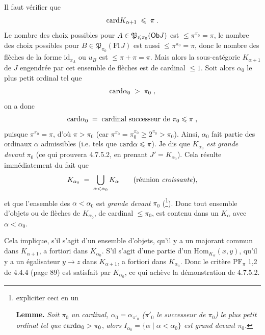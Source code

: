 Il faut vérifier que
\[
\mathrm{card} K_{\alpha+1} \;\leqslant\; \pi \;.
\]
Le nombre des choix possibles pour $A \in \mathfrak{P}_{\leqslant \pi_0}(\mathsf{Ob} J)$  est $\leqslant \pi^{\pi_0} = \pi$, le nombre des choix possibles pour $B \in \mathfrak{P}_{\pi_0}(\mathrm{Fl}\, J)$ est aussi $\leqslant \pi^{\pi_0} = \pi$, donc le nombre des flèches de la forme $\mathrm{id}_{x_A}$ ou $u_B$ est $\leqslant \pi + \pi = \pi$. Mais alors la sous-catégorie $K_{\alpha+1}$ de $J$ engendrée par cet ensemble de flèches est de cardinal $\leqslant 1$. Soit alors %
{}
$\alpha_0$ le plus petit ordinal tel que
\[
\mathrm{card} \alpha_0 \;>\; \pi_0 \;,
\]
on a donc
\[
\mathrm{card} \alpha_0 \;=\; \text{cardinal successeur de } \pi_0 \leqslant \pi \;,
\]
puisque $\pi^{\pi_0} = \pi$, d’où $\pi > \pi_0$ (car $\pi^{\pi_0} = \pi_0^{\pi_0} \geqslant 2^{\pi_0} > \pi_0$). Ainsi, $\alpha_0$ fait partie des ordinaux $\alpha$ admissibles (i.e. tels que $\mathrm{card} \alpha \leqslant \pi$). Je dis que $K_{\alpha_0}$ \textit{est grande devant} $\pi_0$ (ce qui prouvera 4.7.5.2, en prenant $J' = K_{\alpha_0}$). Cela résulte immédiatement du fait que
\[
K_{\alpha_0} \;=\; \bigcup_{\alpha < \alpha_0} K_{\alpha} \qquad (\text{réunion \textit{croissante}}),
\]
et que l’ensemble des $\alpha < \alpha_0$ est \textit{grande devant} $\pi_0$ (\footnote[71]{expliciter ceci en un

\textbf{Lemme.} \textit{Soit $\pi_0$ un cardinal, $\alpha_0 = \alpha_{\pi'_0}$ ($\pi'_0$ le successeur de $\pi_0$) le plus petit ordinal tel que} $\mathrm{card} \alpha_0 > \pi_0$, \textit{alors $I_{\alpha_0} = \{\alpha \mid \alpha < \alpha_0\}$ est grand devant $\pi_0$.}}). Donc tout ensemble d’objets ou de flèches de $K_{\alpha_0}$, de cardinal $\leqslant \pi_0$, est contenu dans un $K_{\alpha}$ avec $\alpha < \alpha_0$.

Cela implique, s’il s’agit d’un ensemble d’objets, qu’il y a un majorant commun dans $K_{\alpha+1}$, a fortiori dans $K_{\alpha_0}$. S’il s’agit d’une partie d’un $\mathrm{Hom}_{K_{\alpha}}(x,y)$, qu’il y a un égalisateur $y \longrightarrow z$ dans $K_{\alpha+1}$, a fortiori dans $K_{\alpha_0}$. Donc le critère $\mathrm{PF}_{\pi}$ 1,2 de 4.4.4 (page 89) est satisfait par $K_{\alpha_0}$, ce qui achève la démonstration de 4.7.5.2.

